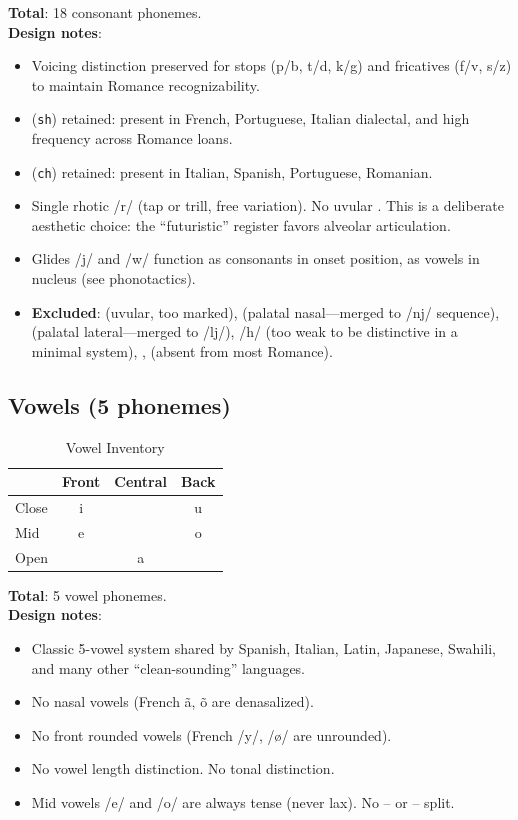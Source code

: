 \documentclass[12pt]{book}
\begin{document}
\noindent \textbf{Total}: 18 consonant phonemes.\\
\textbf{Design notes}:
\begin{itemize}
  \item Voicing distinction preserved for stops (p/b, t/d, k/g) and fricatives
        (f/v, s/z) to maintain Romance recognizability.
  \item {} (\texttt{sh}) retained: present in French, Portuguese,
        Italian dialectal, and high frequency across Romance loans.
  \item {} (\texttt{ch}) retained: present in Italian, Spanish,
        Portuguese, Romanian.
  \item Single rhotic /r/ (tap or trill, free variation). No uvular .
        This is a deliberate aesthetic choice: the ``futuristic'' register
        favors alveolar articulation.
  \item Glides /j/ and /w/ function as consonants in onset position,
        as vowels in nucleus (see phonotactics).
  \item \textbf{Excluded}:  (uvular, too marked),
         (palatal nasal---merged to /nj/ sequence),
         (palatal lateral---merged to /lj/),
        /h/ (too weak to be distinctive in a minimal system),
        ,  (absent from most Romance).
\end{itemize}

\subsection{Vowels (5 phonemes)}

\begin{table}[h]
\centering
\caption{Vowel Inventory}
\label{tab:vowels}
\begin{tabular}{@{}lccc@{}}
\toprule
       & Front & Central & Back \\
\midrule
Close  & i     &         & u    \\
Mid    & e     &         & o    \\
Open   &       & a       &      \\
\bottomrule
\end{tabular}
\end{table}

\noindent \textbf{Total}: 5 vowel phonemes.\\
\textbf{Design notes}:
\begin{itemize}
  \item Classic 5-vowel system shared by Spanish, Italian, Latin, Japanese,
        Swahili, and many other ``clean-sounding'' languages.
  \item No nasal vowels (French \~{a}, \~{o} are denasalized).
  \item No front rounded vowels (French /y/, /\o{}/ are unrounded).
  \item No vowel length distinction. No tonal distinction.
  \item Mid vowels /e/ and /o/ are always tense (never lax). No
        -- or -- split.
\end{itemize}
\end{document}
